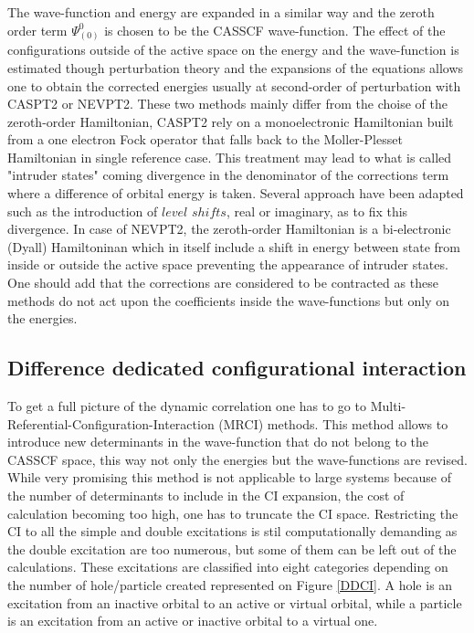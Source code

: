 \documentclass[12pt]{report}
\numberwithin{equation}{section}
\begin{document}
The wave-function and energy are expanded in a similar way and the zeroth order term $\Psi_{(0)}^{0}$ is chosen to be the CASSCF wave-function. 
The effect of the configurations outside of the active space on the energy and the wave-function is estimated though perturbation theory and the expansions of the equations allows one to obtain the corrected energies
usually at second-order of perturbation with CASPT2 or NEVPT2. These two methods mainly differ from the choise of the zeroth-order Hamiltonian, CASPT2 rely on a monoelectronic Hamiltonian built from a one electron Fock operator that falls back to the Moller-Plesset Hamiltonian in single reference case. 
This treatment may lead to what is called "intruder states" coming divergence in the denominator of the corrections term where a difference of orbital energy is taken. Several approach have been adapted such as the introduction of  $level$ $shifts$, real or imaginary, as to fix this divergence.
In case of NEVPT2, the zeroth-order Hamiltonian is a bi-electronic (Dyall) Hamiltoninan which in itself include a shift in energy between state from inside or outside the active space preventing the appearance of intruder states.
One should add that the corrections are considered to be contracted as these methods do not act upon the coefficients inside the wave-functions but only on the energies.

\subsection{Difference dedicated configurational interaction}

To get a full picture of the dynamic correlation one has to go to Multi-Referential-Configuration-Interaction (MRCI) methods.
This method allows to introduce new determinants in the wave-function that do not belong to the CASSCF space, this way not only the energies but the wave-functions are revised.
While very promising this method is not applicable to large systems because of the number of determinants to include in the CI expansion, the cost of calculation becoming too high, one has to truncate the CI space.
Restricting the CI to all the simple and double excitations is stil computationally demanding as the double excitation are too numerous, but some of them can be left out of the calculations. 
These excitations are classified into eight categories depending on the number of hole/particle created represented on Figure \ref{DDCI}. 
A hole is an excitation from an inactive orbital to an active or virtual orbital, while a particle is an excitation from an active or inactive orbital to a virtual one.
\end{document}
